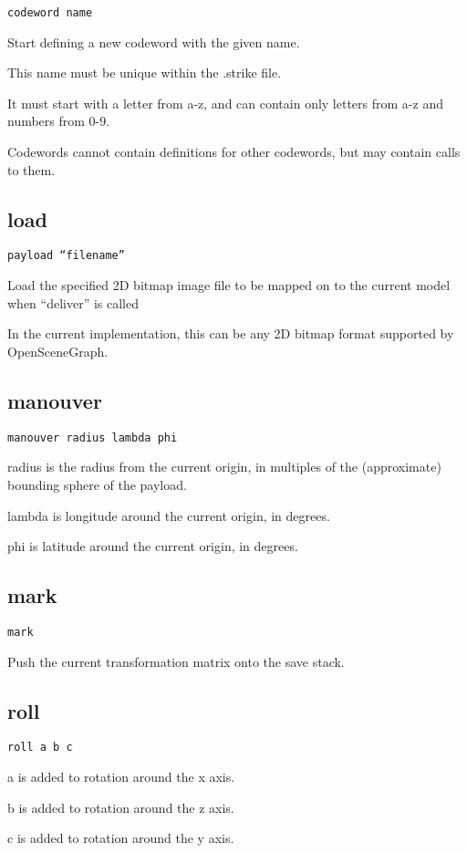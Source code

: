 \documentclass[12pt]{article}
\begin{document}
\texttt{codeword name}

Start defining a new codeword with the given name.

This name must be unique within the .strike file.

It must start with a letter from a-z, and can contain only letters from a-z and numbers from 0-9.

Codewords cannot contain definitions for other codewords, but may contain calls to them.

\subsection{load}

\texttt{payload ``filename''}

Load the specified 2D bitmap image file to be mapped on to the current model when ``deliver'' is called

In the current implementation, this can be any 2D bitmap format supported by OpenSceneGraph.

\subsection{manouver}

\texttt{manouver radius lambda phi}

radius is the radius from the current origin, in multiples of the (approximate) bounding sphere of the payload.

lambda is longitude around the current origin, in degrees.

phi is latitude around the current origin, in degrees.

\subsection{mark}

\texttt{mark}

Push the current transformation matrix onto the save stack. 

\subsection{roll}

\texttt{roll a b c}

a is added to rotation around the x axis.

b is added to rotation around the z axis.

c is added to rotation around the y axis.
\end{document}
